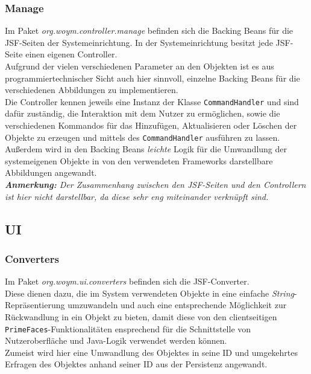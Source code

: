 \documentclass[fontsize=12pt,paper=a4,twoside]{scrartcl}
\begin{document}
\subsubsection{Manage}

Im Paket \textit{org.woym.controller.manage} befinden sich die Backing Beans für die JSF-Seiten der Systemeinrichtung. In der Systemeinrichtung besitzt jede JSF-Seite einen eigenen Controller.\\
Aufgrund der vielen verschiedenen Parameter an den Objekten ist es aus programmiertechnischer Sicht auch hier sinnvoll, einzelne Backing Beans für die verschiedenen Abbildungen zu implementieren.\\
Die Controller kennen jeweils eine Instanz der Klasse \texttt{CommandHandler} und sind dafür zuständig, die Interaktion mit dem Nutzer zu ermöglichen, sowie die verschiedenen Kommandos für das Hinzufügen, Aktualisieren oder Löschen der Objekte zu erzeugen und mittels des \texttt{CommandHandler} ausführen zu lassen. Außerdem wird in den Backing Beans \textit{leichte} Logik für die Umwandlung der systemeigenen Objekte in von den verwendeten Frameworks darstellbare Abbildungen angewandt.\\

\textit{\textbf{Anmerkung:} Der Zusammenhang zwischen den JSF-Seiten und den Controllern ist hier nicht darstellbar, da diese sehr eng miteinander verknüpft sind.\\}






\subsection{UI}
\label{subsec:UI}

\subsubsection{Converters}

Im Paket \textit{org.woym.ui.converters} befinden sich die JSF-Converter.\\
Diese dienen dazu, die im System verwendeten Objekte in eine einfache \textit{String}-Repräsentierung umzuwandeln und auch eine entsprechende Möglichkeit zur Rückwandlung in ein Objekt zu bieten, damit diese von den clientseitigen \texttt{PrimeFaces}-Funktionalitäten ensprechend für die Schnittstelle von Nutzeroberfläche und Java-Logik verwendet werden können.\\
Zumeist wird hier eine Umwandlung des Objektes in seine ID und umgekehrtes Erfragen des Objektes anhand seiner ID aus der Persistenz angewandt.\\
\end{document}
